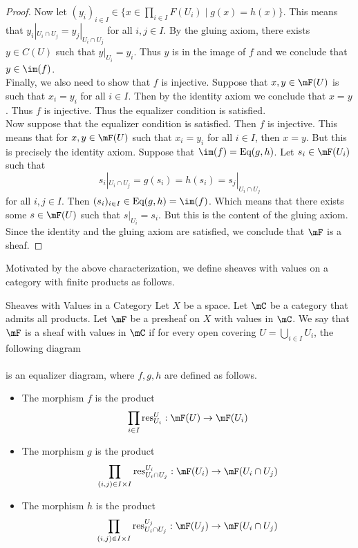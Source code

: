 \documentclass[a4paper]{article}
\begin{document}
\begin{thm}{}{}
\begin{proof}
Now let $(y_i)_{i\in I}\in\{x\in\prod_{i\in I}F(U_i)\;|\;g(x)=h(x)\}$. This means that $y_i|_{U_i\cap U_j}=y_j|_{U_i\cap U_j}$ for all $i,j\in I$. By the gluing axiom, there exists $y\in C(U)$ such that $y|_{U_i}=y_i$. Thus $y$ is in the image of $f$ and we conclude that $y\in\im(f)$. \\

Finally, we also need to show that $f$ is injective. Suppose that $x,y\in\mF(U)$ is such that $x_i=y_i$ for all $i\in I$. Then by the identity axiom we conclude that $x=y$. Thus $f$ is injective. Thus the equalizer condition is satisfied. \\

Now suppose that the equalizer condition is satisfied. Then $f$ is injective. This means that for $x,y\in\mF(U)$ such that $x_i=y_i$ for all $i\in I$, then $x=y$. But this is precisely the identity axiom. Suppose that $\im(f)=\text{Eq}(g,h)$. Let $s_i\in\mF(U_i)$ such that $$s_i|_{U_i\cap U_j}=g(s_i)=h(s_i)=s_j|_{U_i\cap U_j}$$ for all $i,j\in I$. Then $(s_i)_{i\in I}\in\text{Eq}(g,h)=\im(f)$. Which means that there exists some $s\in\mF(U)$ such that $s|_{U_i}=s_i$. But this is the content of the gluing axiom. Since the identity and the gluing axiom are satisfied, we conclude that $\mF$ is a sheaf. 
\end{proof}
\end{thm}

Motivated by the above characterization, we define sheaves with values on a category with finite products as follows. 

\begin{defn}{Sheaves with Values in a Category}{} Let $X$ be a space. Let $\mC$ be a category that admits all products. Let $\mF$ be a presheaf on $X$ with values in $\mC$. We say that $\mF$ is a sheaf with values in $\mC$ if for every open covering $U=\bigcup_{i\in I}U_i$, the following diagram \\
\\
is an equalizer diagram, where $f,g,h$ are defined as follows. 
\begin{itemize}
\item The morphism $f$ is the product $$\prod_{i\in I}\text{res}_{U_i}^U:\mF(U)\to\mF(U_i)$$
\item The morphism $g$ is the product $$\prod_{(i,j)\in I\times I}\text{res}_{U_i\cap U_j}^{U_i}:\mF(U_i)\to\mF(U_i\cap U_j)$$
\item The morphism $h$ is the product $$\prod_{(i,j)\in I\times I}\text{res}_{U_i\cap U_j}^{U_j}:\mF(U_j)\to\mF(U_i\cap U_j)$$
\end{itemize}
\end{defn}
\end{document}
